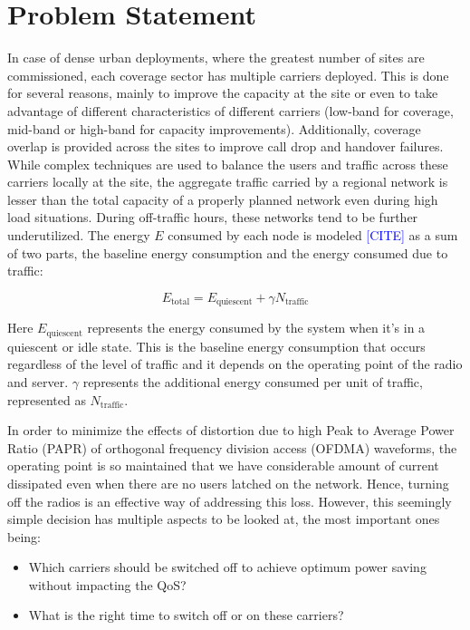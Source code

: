 \section{Problem Statement}
\label{sec:ps}

In case of dense urban deployments, where the greatest number of sites are commissioned, each coverage sector has multiple carriers deployed. 
This is done for several reasons, mainly to improve the capacity at the site or even to take advantage of different characteristics of different carriers (low-band for coverage, mid-band or high-band for capacity improvements). 
Additionally, coverage overlap is provided across the sites to improve call drop and handover failures. 
While complex techniques are used to balance the users and traffic across these carriers locally at the site, the aggregate traffic carried by a regional network is lesser than the total capacity of a properly planned network even during high load situations. 
During off-traffic hours, these networks tend to be further underutilized. The energy $E$ consumed by each node is modeled \textcolor{blue}{[CITE]} as a sum of two parts, the baseline energy consumption and the energy consumed due to traffic:

\begin{equation}
E_{\text{total}} = E_{\text{quiescent}} + \gamma N_{\text{traffic}} \tag{1}
\end{equation}

Here $E_{\text{quiescent}}$ represents the energy consumed by the system when it's in a quiescent or idle state. 
This is the baseline energy consumption that occurs regardless of the level of traffic and it depends on the operating point of the radio and server.
$\gamma$ represents the additional energy consumed per unit of traffic, represented as $N_{\text{traffic}}$.

In order to minimize the effects of distortion due to high Peak to Average Power Ratio (PAPR) of orthogonal frequency division access (OFDMA) waveforms, the operating point is so maintained that we have considerable amount of current dissipated even when there are no users latched on the network. 
Hence, turning off the radios is an effective way of addressing this loss. 
However, this seemingly simple decision has multiple aspects to be looked at, the most important ones being:

\begin{itemize}
\item Which carriers should be switched off to achieve optimum power saving without impacting the QoS?
\item What is the right time to switch off or on these carriers?
\end{itemize}

